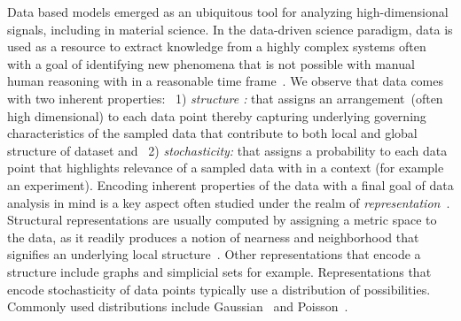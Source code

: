 Data based models emerged as an ubiquitous tool for analyzing high-dimensional signals, including in material science. 
In the data-driven science paradigm, data is used as a resource to extract knowledge from a highly complex systems often with a goal of identifying new phenomena that is not possible with manual human reasoning with in a reasonable time frame~\cite{brunton2019data}.
We observe that data comes with two inherent properties: ~1) \textit{structure :} that assigns an arrangement~(often high dimensional) to each data point thereby capturing underlying governing characteristics of the sampled data that contribute to both local and global structure of dataset and ~2) \textit{stochasticity:} that assigns a probability to each data point that highlights relevance of a sampled data with in a context (for example an experiment). 
Encoding inherent properties of the data with a final goal of data analysis in mind is a key aspect often studied under the realm of \textit{representation}~\cite{bengio2013representation}. 
Structural representations are usually computed by assigning a metric space to the data, as it readily produces a notion of nearness and neighborhood that signifies an underlying local structure~\cite{mcinnes2018umap}. 
Other representations that encode a structure include graphs and simplicial sets for example. Representations that encode stochasticity of data points typically use a distribution of possibilities. 
Commonly used distributions include Gaussian~\cite{gardner2015bayesian,gavaghan2018use} and Poisson~\cite{flory1940molecular}.


